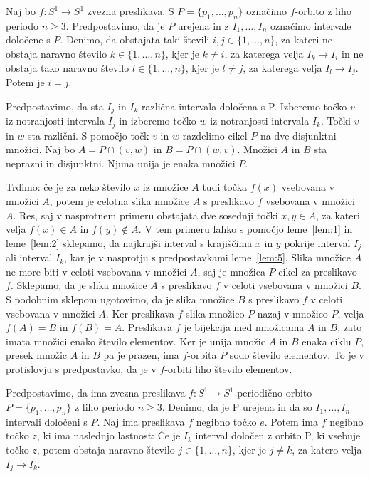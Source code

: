 \documentclass[../TG_magistrsko_delo_sections.tex]{subfiles}
\begin{document}
\begin{lema}\label{lem:5}					%
Naj bo $f : S^1 \to S^1$ zvezna preslikava. S $P=\{p_1, \dots, p_n\}$ označimo $f$-orbito z liho periodo $n \geq 3$. Predpostavimo, da je $P$ urejena in z $I_1, \dots, I_n$ označimo intervale določene s $P$. Denimo, da obstajata taki števili $i, j \in \{1, \dots, n \}$, za kateri ne obstaja naravno število $k \in \{1, \dots, n\}$, kjer je $k \neq i$, za katerega velja $I_k \to I_i$ in ne obstaja tako naravno število $l \in \{1, \dots, n\}$, kjer je $l \neq j$, za katerega velja $I_l \to I_j$. Potem je $i=j$.
\end{lema}

\begin{dokaz}
Predpostavimo, da sta $I_j$ in $I_k$ različna intervala določena s P. Izberemo točko $v$ iz notranjosti intervala $I_j$ in izberemo točko $w$ iz notranjosti intervala $I_k$. Točki $v$ in $w$ sta različni. S pomočjo točk $v$ in $w$ razdelimo cikel $P$ na dve disjunktni množici. Naj bo $A = P \cap (v, w)$ in $B = P \cap (w, v)$. Množici $A$ in $B$ sta neprazni in disjunktni. Njuna unija je enaka množici $P$.

Trdimo: če je za neko število $x$ iz množice $A$ tudi točka $f(x)$ vsebovana v množici $A$, potem je celotna slika množice $A$ s preslikavo $f$ vsebovana v množici $A$. Res, saj v nasprotnem primeru obstajata dve sosednji točki $x, y \in A$, za kateri velja $f(x) \in A$ in $f(y) \notin A$. V tem primeru lahko s pomočjo leme~\ref{lem:1} in leme~\ref{lem:2} sklepamo, da najkrajši interval s krajiščima $x$ in $y$ pokrije interval $I_j$ ali interval $I_k$, kar je v nasprotju s predpostavkami leme~\ref{lem:5}. Slika množice $A$ ne more biti v celoti vsebovana v množici $A$, saj je množica $P$ cikel za preslikavo $f$. Sklepamo, da je slika množice $A$ s preslikavo $f$ v celoti vsebovana v množici $B$. S podobnim sklepom ugotovimo, da je slika množice $B$ s preslikavo $f$ v celoti vsebovana v množici $A$. Ker preslikava $f$ slika množico $P$ nazaj v množico $P$, velja $f(A) = B$ in $f(B) = A$. Preslikava $f$ je bijekcija med množicama $A$ in $B$, zato imata množici enako število elementov. Ker je unija množic $A$ in $B$ enaka ciklu $P$, presek množic $A$ in $B$ pa je prazen, ima $f$-orbita $P$ sodo število elementov. To je v protislovju s predpostavko, da je v $f$-orbiti liho število elementov.
\end{dokaz}

\begin{lema}\label{lem:6}				%
Predpostavimo, da ima zvezna preslikava $f : S^1 \to S^1$ periodično orbito $P = \{p_1, \dots, p_n\}$ z liho periodo $n \geq 3$. Denimo, da je P urejena in da so $I_1, \dots, I_n$ intervali določeni s $P$. Naj ima preslikava $f$ negibno točko $e$. Potem ima $f$ negibno točko $z$, ki ima naslednjo lastnost: Če je $I_k$ interval določen z orbito P, ki vsebuje točko $z$, potem obstaja naravno število $j \in \{1, \dots, n\}$, kjer je $j \neq k$, za katero velja $I_j \to I_k$.
\end{lema}
\end{document}
